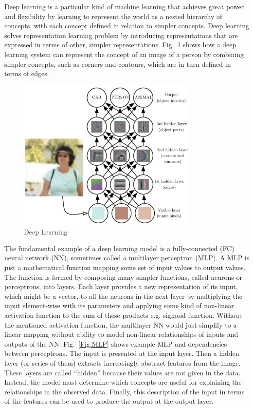 Deep learning is a particular kind of machine learning that achieves great power and flexibility by learning to represent the world as a nested hierarchy of concepts, with each concept defined in relation to simpler concepts. Deep learning solves representation learning problem by introducing representations that are expressed in terms of other, simpler representations. Fig.~\ref{Fig.DL} shows how a deep learning system can represent the concept of an image of a person by combining simpler concepts, such as corners and contours, which are in turn defined in terms of edges.

\begin{figure}[H]
\includegraphics[width=0.8\textwidth,keepaspectratio]{figures/DL.png}
\caption[Deep Learning]{Deep Learning \protect\cite{Book.DeepLearning}}
\label{Fig.DL}
\end{figure}

The fundamental example of a deep learning model is a fully-connected (FC) neural network (NN), sometimes called a multilayer perceptron (MLP). A MLP is just a mathematical function mapping some set of input values to output values. The function is formed by composing many simpler functions, called neurons or perceptrons, into layers. Each layer provides a new representation of its input, which might be a vector, to all the neurons in the next layer by multiplying the input element-wise with its parameters and applying some kind of non-linear activation function to the sum of these products e.g. sigmoid function. Without the mentioned activation function, the multilayer NN would just simplify to a linear mapping without ability to model non-linear relationships of inputs and outputs of the NN. Fig.~\ref{Fig.MLP} shows example MLP and dependencies between perceptrons. The input is presented at the input layer. Then a hidden layer (or series of them) extracts increasingly abstract features from the image. These layers are called “hidden” because their values are not given in the data. Instead, the model must determine which concepts are useful for explaining the relationships in the observed data. Finally, this description of the input in terms of the features can be used to produce the output at the output layer.

